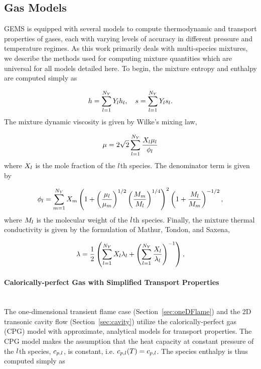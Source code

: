 \subsection{Gas Models}\label{subsec:gasModels}

GEMS is equipped with several models to compute thermodynamic and transport properties of gases, each with varying levels of accuracy in different pressure and temperature regimes. As this work primarily deals with multi-species mixtures, we describe the methods used for computing mixture quantities which are universal for all models detailed here. To begin, the mixture entropy and enthalpy are computed simply as

\begin{equation}
	h = \sum_{l = 1}^{N_Y} Y_{l} h_{l}, \quad s = \sum_{l = 1}^{N_Y} Y_{l} s_{l}.
\end{equation}
The mixture dynamic viscosity is given by Wilke's mixing law,

\begin{equation}\label{eq:viscMix}
	\mu = 2 \sqrt{2} \sum_{l = 1}^{N_Y} \frac{X_{l} \mu_{l}}{\phi_{l}}
\end{equation}
where $X_{l}$ is the mole fraction of the $l$th species. The denominator term is given by

\begin{equation}\label{eq:viscMixDenom}
	\phi_{l} = \sum_{m = 1}^{N_Y} X_{m} \left( 1 + \left( \frac{\mu_{l}}{\mu_{m}} \right)^{1/2} \left( \frac{M_{m}}{M_{l}} \right)^{1/4} \right)^2 \left( 1 + \frac{M_{l}}{M_{m}} \right)^{-1/2},
\end{equation}
where $M_{l}$ is the molecular weight of the $l$th species. Finally, the mixture thermal conductivity is given by the formulation of Mathur, Tondon, and Saxena,

\begin{equation}\label{eq:thermCondMix}
    \lambda = \frac{1}{2} \left( \sum_{l = 1}^{N_Y} X_{l} \lambda_{l} + \left(\sum_{l = 1}^{N_Y} \frac{X_{l}}{\lambda_{l}} \right)^{-1} \right),
\end{equation}


\paragraph*{Calorically-perfect Gas with Simplified Transport Properties}\mbox{}\\

The one-dimensional transient flame case (Section~\ref{sec:oneDFlame}) and the 2D transonic cavity flow (Section~\ref{sec:cavity}) utilize the calorically-perfect gas (CPG) model with approximate, analytical models for transport properties. The CPG model makes the assumption that the heat capacity at constant pressure of the $l$th species, $c_{p,l}$, is constant, i.e. $c_{p,l}(T) = c_{p,l}$. The species enthalpy is thus computed simply as

